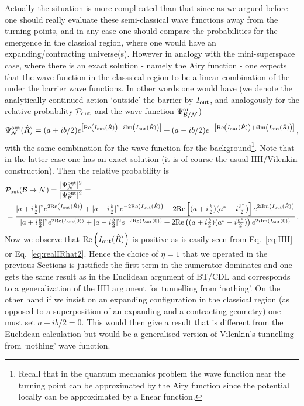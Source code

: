 \documentclass[11pt,a4paper]{article}
\begin{document}
Actually the situation is more complicated than that since as we argued
before one should really evaluate these semi-classical wave functions
away from the turning points, and in any case one should compare the
probabilities for the emergence in the classical region, where one
would have an expanding/contracting universe(s). However in analogy
with the mini-superspace case, where there is an exact solution -
namely the Airy function - one expects that the wave function in the
classsical region to be a linear combination of the under the barrier
wave functions. In other words one would have (we denote the analytically continued action `outside' the barrier by $I_{{\rm out}}$, and analogously for the relative probability $\mathcal{P}_{\rm out}$ and the wave function $\Psi^{\rm out}_{\mathcal{B}/\mathcal{N}}$) 
\begin{equation}
\Psi_{\mathcal{N}}^{\rm out}(\hat{R})=(a+ib/2)e^{\left[\text{Re}\left(I_{{\rm out}}(\hat{R})\right)+ i \text{Im} \left(I_{{\rm out}}(\hat{R})\right)\right]} + (a-ib/2) e^{-\left[\text{Re}\left(I_{{\rm out}}(\hat{R})\right) + i \text{Im} \left(I_{{\rm out}}(\hat{R})\right)\right]} \,,
\end{equation}
with  the same combination for the wave function for the
background\footnote{Recall that  in the quantum mechanics problem the wave function near the turning point can be approximated by the Airy function since the potential locally can be approximated by a linear function.}. Note that in the latter case one has an exact solution
(it is of course the usual HH/Vilenkin construction). 
Then the relative probability is 
\begin{align}
\label{eq:Pout}
& \mathcal{P}_{{\rm {\rm out}}}(\mathcal{B} \rightarrow \mathcal{N}) = \frac{|\Psi^{{\rm out}}_{{\cal N}}|^{2}}{|\Psi^{{\rm out}}_{{\cal B}}|^{2}} =  \\
& = \frac{|a+i\frac{b}{2}|^{2} e^{2 \text{Re}\left(I_{\rm out}(\hat{R})\right)} + |a-i\frac{b}{2}|^{2}e^{-2 \text{Re}\left(I_{{\rm out}}(\hat{R})\right)}+2\text{Re}\left[(a+i\frac{b}{2})(a^{*}-i\frac{b^{*}}{2})\right]e^{2i\text{Im} \left(I_{\rm out}(\hat{R})\right)}}{|a+i\frac{b}{2}|^{2}e^{2 \text{Re}\left(I_{{\rm out}}(0)\right)} + |a-i\frac{b}{2}|^{2} e^{-2 \text{Re}\left(I_{{\rm out}}(0)\right)} + 2 \text{Re}\left((a+i\frac{b}{2})(a^{*}-i\frac{b^{*}}{2})\right) e^{2i \text{Im} \left(I_{{\rm out}}(0)\right)}} \,.\nonumber
\end{align}
Now we observe that $\text{Re}\left(I_{{\rm out}}(\hat{R})\right)$ is positive as is easily seen from Eq.~\eqref{eq:HH} or Eq.~\eqref{eq:realIRhat2}. Hence the choice of $\eta = 1$ that we operated in the previous Sections is justified: the first term in the numerator dominates and one gets the same result as in the Euclidean argument of BT/CDL and corresponds to a generalization of the HH argument for tunnelling from `nothing'. On the other hand if we insist on an expanding configuration in the classical region (as opposed to a superposition of an expanding and a contracting geometry) one must set $a + ib/2 = 0$. This would then give a result that is different from the Euclidean calculation but would be a generalised version of Vilenkin's tunnelling from `nothing' wave function. 
\end{document}
